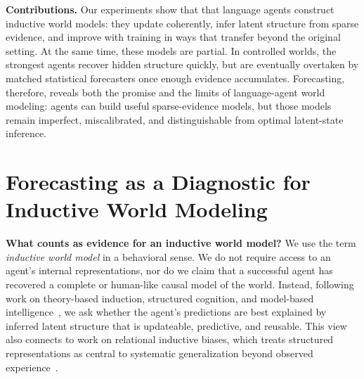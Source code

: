 \documentclass{article} %
\begin{document}



\textbf{Contributions.} Our experiments show that that language agents construct inductive world models: they update coherently, infer latent structure from sparse evidence, and improve with training in ways that transfer beyond the original setting.
At the same time, these models are partial.
In controlled worlds, the strongest agents recover hidden structure quickly, but are eventually overtaken by matched statistical forecasters once enough evidence accumulates.
Forecasting, therefore, reveals both the promise and the limits of language-agent world modeling: agents can build useful sparse-evidence models, but those models remain imperfect, miscalibrated, and distinguishable from optimal latent-state inference.


\section{Forecasting as a Diagnostic for Inductive World Modeling}
\label{sec:forecasting-as-inductive}

\textbf{What counts as evidence for an inductive world model?}
We use the term \emph{inductive world model} in a behavioral sense.
We do not require access to an agent's internal representations, nor do we claim that a successful agent has recovered a complete or human-like causal model of the world.
Instead, following work on theory-based induction, structured cognition, and model-based intelligence~\citep{tenenbaum2006theory,griffiths2010probabilistic,tenenbaum2011mind,lake2017building,ha2018world}, we ask whether the agent’s predictions are best explained by inferred latent structure that is updateable, predictive, and reusable.
This view also connects to work on relational inductive biases, which treats structured representations as central to systematic generalization beyond observed experience~\citep{battaglia2018relational}.
\end{document}
